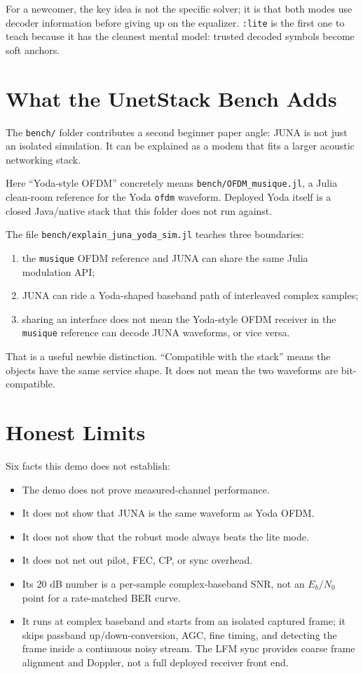 \documentclass[11pt]{article}
\newcommand{\code}[1]{\texttt{#1}}
\newcommand{\juna}{JUNA}
\begin{document}
For a newcomer, the key idea is not the specific solver; it is that both modes
use decoder information before giving up on the equalizer.
\code{:lite} is the first one to teach because it has the cleanest mental model:
trusted decoded symbols become soft anchors.

\section{What the UnetStack Bench Adds}

The \code{bench/} folder contributes a second beginner paper angle: \juna{} is
not just an isolated simulation. It can be explained as a modem that fits a
larger acoustic networking stack.

Here ``Yoda-style OFDM'' concretely means \code{bench/OFDM\_musique.jl}, a
Julia clean-room reference for the Yoda \code{ofdm} waveform. Deployed Yoda
itself is a closed Java/native stack that this folder does not run against.

The file \code{bench/explain\_juna\_yoda\_sim.jl} teaches three boundaries:
\begin{enumerate}
  \item the \code{musique} OFDM reference and \juna{} can share the same Julia
        modulation API;
  \item \juna{} can ride a Yoda-shaped baseband path of interleaved complex
        samples;
  \item sharing an interface does not mean the Yoda-style OFDM receiver in the
        \code{musique} reference can decode \juna{} waveforms, or vice versa.
\end{enumerate}

That is a useful newbie distinction. ``Compatible with the stack'' means the
objects have the same service shape. It does not mean the two waveforms are
bit-compatible.

\section{Honest Limits}

Six facts this demo does not establish:
\begin{itemize}
  \item The demo does not prove measured-channel performance.
  \item It does not show that \juna{} is the same waveform as Yoda OFDM.
  \item It does not show that the robust mode always beats the lite mode.
  \item It does not net out pilot, FEC, CP, or sync overhead.
  \item Its 20 dB number is a per-sample complex-baseband SNR, not an
        \(E_b/N_0\) point for a rate-matched BER curve.
  \item It runs at complex baseband and starts from an isolated captured frame;
        it skips passband up/down-conversion, AGC, fine timing, and detecting
        the frame inside a continuous noisy stream. The LFM sync provides coarse
        frame alignment and Doppler, not a full deployed receiver front end.
\end{itemize}
\end{document}
